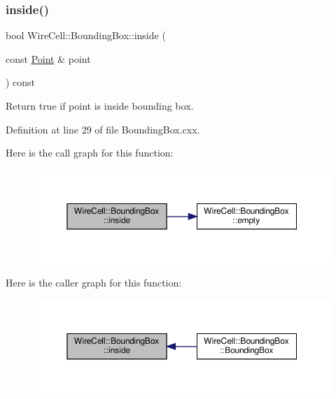\subsubsection{\texorpdfstring{inside()}{inside()}}
{\footnotesize\ttfamily bool Wire\+Cell\+::\+Bounding\+Box\+::inside (\begin{DoxyParamCaption}\item[{const \hyperlink{namespace_wire_cell_ab2b2565fa6432efbb4513c14c988cda9}{Point} \&}]{point }\end{DoxyParamCaption}) const}



Return true if point is inside bounding box. 



Definition at line 29 of file Bounding\+Box.\+cxx.

Here is the call graph for this function\+:
\nopagebreak
\begin{figure}[H]
\begin{center}
\leavevmode
\includegraphics[width=350pt]{class_wire_cell_1_1_bounding_box_a5d0ef4e3335f0aaf0a4a8fa577914539_cgraph}
\end{center}
\end{figure}
Here is the caller graph for this function\+:
\nopagebreak
\begin{figure}[H]
\begin{center}
\leavevmode
\includegraphics[width=350pt]{class_wire_cell_1_1_bounding_box_a5d0ef4e3335f0aaf0a4a8fa577914539_icgraph}
\end{center}
\end{figure}
\mbox{\label{class_wire_cell_1_1_bounding_box_a2f43d9aa9cf70e9515cdad9e43537575}} 
